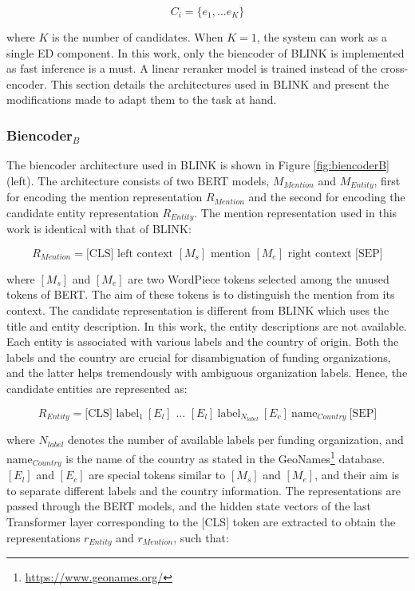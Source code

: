 \documentclass{report}
\theoremstyle{definition}
\theoremstyle{remark}
\begin{document}
\begin{equation}
    C_i = \{e_1,...e_K\} 
\end{equation}

\noindent where $K$ is the number of candidates. When $K=1$, the system can work as a single ED component. In this work, only the biencoder of BLINK is implemented as fast inference is a must. A linear reranker model is trained instead of the cross-encoder. This section details the architectures used in BLINK and present the modifications made to adapt them to the task at hand.

\subsubsection{Biencoder$_{B}$}
\label{sec:biencoderbexplanation}
The biencoder architecture used in BLINK is shown in Figure \ref{fig:biencoderB} (left). The architecture consists of two BERT models, $M_{Mention}$ and $M_{Entity}$, first for encoding the mention representation $R_{Mention}$ and the second for encoding the candidate entity representation $R_{Entity}$. The mention representation used in this work is identical with that of BLINK:

\begin{equation}
    R_{Mention} = \text{[CLS]} \text{ left context } [M_s] \text{ mention }  [M_e] \text{ right context } \text{[SEP]}
\end{equation}

\noindent where $[M_s]$ and $[M_e]$ are two WordPiece tokens selected among the unused tokens of BERT. The aim of these tokens is to distinguish the mention from its context. 
The candidate representation is different from BLINK which uses the title and entity description. In this work, the entity descriptions are not available. Each entity is associated with various labels and the country of origin. Both the labels and the country are crucial for disambiguation of funding organizations, and the latter helps tremendously with ambiguous organization labels. Hence, the candidate entities are represented as:

\begin{equation}
    R_{Entity} = \text{[CLS] } \text{label}_{1} \ [E_l] \text{ ... } [E_l] \ \text{label}_{N_{label}} \ [E_c] \ \text{name}_{Country} \ \text{[SEP]}
\end{equation}

\noindent where $N_{label}$ denotes the number of available labels per funding organization, and $\text{name}_{Country}$ is the name of the country as stated in the GeoNames\footnote{\url{https://www.geonames.org/}} database. $[E_l]$ and $[E_c]$ are special tokens similar to $[M_s]$ and $[M_e]$, and their aim is to separate different labels and the country information. The representations are passed through the BERT models, and the hidden state vectors of the last Transformer layer corresponding to the [CLS] token are extracted to obtain the representations $r_{Entity}$ and $r_{Mention}$, such that:
\end{document}
